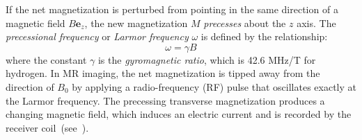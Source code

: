 If the net magnetization is perturbed from pointing in the same direction of a magnetic field $B\bm{e}_z$, the new magnetization $M$ \textit{precesses} about the $z$ axis. The \textit{precessional frequency} or \textit{Larmor frequency} $\omega$ is defined by the relationship:
\begin{equation}
\omega = \gamma B
\end{equation}
where the constant $\gamma$ is the \textit{gyromagnetic ratio}, which is 42.6 MHz/T for hydrogen. In MR imaging, the net magnetization is tipped away from the direction of $B_0$ by applying a radio-frequency (RF) pulse that oscillates exactly at the Larmor frequency. The precessing transverse magnetization produces a changing magnetic field, which induces an electric current and is recorded by the receiver coil~(see~).

